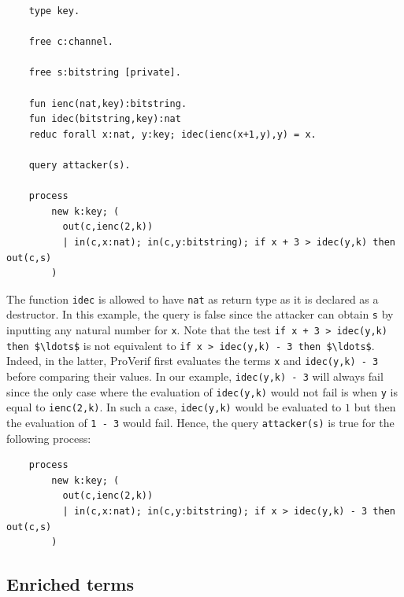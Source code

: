 \documentclass{book}
\begin{document}
\begin{lstlisting}
	type key.

	free c:channel.

	free s:bitstring [private].

	fun ienc(nat,key):bitstring.
	fun idec(bitstring,key):nat
	reduc forall x:nat, y:key; idec(ienc(x+1,y),y) = x.

	query attacker(s).

	process
		new k:key; (
		  out(c,ienc(2,k))
		  | in(c,x:nat); in(c,y:bitstring); if x + 3 > idec(y,k) then out(c,s)
		)
\end{lstlisting}

The function \lstinline!idec! is allowed to have \lstinline!nat! as return type as it is declared as a destructor. In this example, the query is false since the attacker can obtain \lstinline!s! by inputting any natural number for \lstinline!x!. Note that the test \lstinline!if x + 3 > idec(y,k) then $\ldots$! is not equivalent to \lstinline!if x > idec(y,k) - 3 then $\ldots$!. Indeed, in the latter, ProVerif first evaluates the terms \lstinline!x! and \lstinline!idec(y,k) - 3! before comparing their values. In our example, \lstinline!idec(y,k) - 3! will always fail since the only case where the evaluation of \lstinline!idec(y,k)! would not fail is when \lstinline!y! is equal to \lstinline!ienc(2,k)!. In such a case, \lstinline!idec(y,k)! would be evaluated to $1$ but then the evaluation of \lstinline!1 - 3! would fail. Hence, the query \lstinline!attacker(s)! is true for the following process:
\begin{lstlisting}
	process
		new k:key; (
		  out(c,ienc(2,k))
		  | in(c,x:nat); in(c,y:bitstring); if x > idec(y,k) - 3 then out(c,s)
		)
\end{lstlisting}

\subsection{Enriched terms}\label{sec:enrichedTerms}
\end{document}
